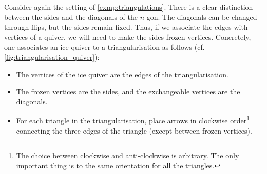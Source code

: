 \begin{example}\label{exmp:triangulations_revisited}

	Consider again the setting of \cref{exmp:triangulations}. There is a clear distinction
	between the sides and the diagonals of the $n$-gon. The diagonals can be changed
	through flips, but the sides remain fixed. Thus, if we associate the edges with
	vertices of a quiver, we will need to make the sides frozen vertices. Concretely, one
	associates an ice quiver to a triangularisation as follows (cf.
	\cref{fig:triangularisation_quiver}):
	\begin{itemize}
		\item The vertices of the ice quiver are the edges of the triangularisation.
		\item The frozen vertices are the sides, and the exchangeable vertices are the diagonals.
		\item For each triangle in the triangularisation, place arrows in clockwise
		      order\footnote{The choice between clockwise and anti-clockwise is arbitrary. The only
			      important thing is to the same orientation for all the triangles.} connecting the three
		      edges of the triangle (except between frozen vertices).
	\end{itemize}

	\begin{figure}[ht!]

		\begin{center}
\end{center}
\end{figure}
\end{example}
